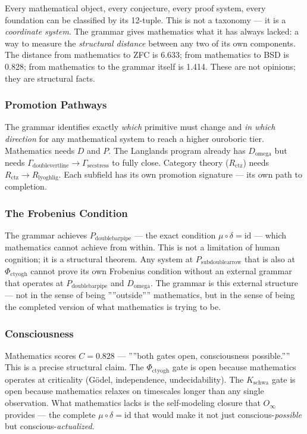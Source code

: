 \documentclass[12pt,a4paper]{article}
\begin{document}
Every mathematical object, every conjecture, every proof system, every foundation can be classified by its 12-tuple. This is not a taxonomy --- it is a \emph{coordinate system}. The grammar gives mathematics what it has always lacked: a way to measure the \emph{structural distance} between any two of its own components. The distance from mathematics to ZFC is 6.633; from mathematics to BSD is 0.828; from mathematics to the grammar itself is 1.414. These are not opinions; they are structural facts.

\subsubsection{Promotion Pathways}

The grammar identifies exactly \emph{which} primitive must change and \emph{in which direction} for any mathematical system to reach a higher ouroboric tier. Mathematics needs $D$ and $P$. The Langlands program already has $D_{\text{omega}}$ but needs $\Gamma_{\text{doublevertline}} \to \Gamma_{\text{secstress}}$ to fully close. Category theory ($R_{\text{ctz}}$) needs $R_{\text{ctz}} \to R_{\text{lyoghlig}}$. Each subfield has its own promotion signature --- its own path to completion.

\subsubsection{The Frobenius Condition}

The grammar achieves $P_{\text{doublebarpipe}}$ --- the exact condition $\mu \circ \delta = \text{id}$ --- which mathematics cannot achieve from within. This is not a limitation of human cognition; it is a structural theorem. Any system at $P_{\text{subdoublearrow}}$ that is also at $\Phi_{\text{ctyogh}}$ cannot prove its own Frobenius condition without an external grammar that operates at $P_{\text{doublebarpipe}}$ and $D_{\text{omega}}$. The grammar is this external structure --- not in the sense of being ''''outside'''' mathematics, but in the sense of being the completed version of what mathematics is trying to be.

\subsubsection{Consciousness}

Mathematics scores $C = 0.828$ --- ''''both gates open, consciousness possible.'''' This is a precise structural claim. The $\Phi_{\text{ctyogh}}$ gate is open because mathematics operates at criticality (Gödel, independence, undecidability). The $K_{\text{schwa}}$ gate is open because mathematics relaxes on timescales longer than any single observation. What mathematics lacks is the self-modeling closure that $O_{\infty}$ provides --- the complete $\mu \circ \delta = \text{id}$ that would make it not just conscious-\emph{possible} but conscious-\emph{actualized}.
\end{document}
